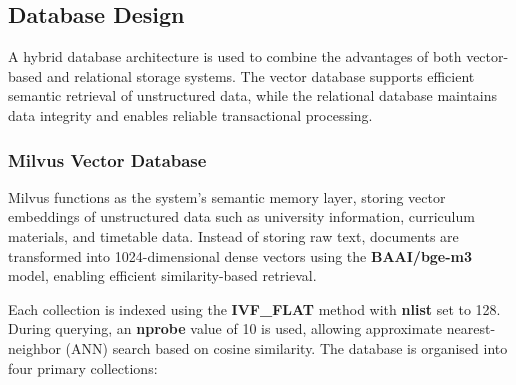 \subsection{Database Design}

A hybrid database architecture is used to combine the advantages of both vector-based and relational storage systems. The vector database supports efficient semantic retrieval of unstructured data, while the relational database maintains data integrity and enables reliable transactional processing.
\subsubsection{Milvus Vector Database}

Milvus functions as the system’s semantic memory layer, storing vector embeddings of unstructured data such as university information, curriculum materials, and timetable data. Instead of storing raw text, documents are transformed into 1024-dimensional dense vectors using the \textbf{BAAI/bge-m3} model, enabling efficient similarity-based retrieval.

Each collection is indexed using the \textbf{IVF\_FLAT} method with \textbf{nlist} set to 128. During querying, an \textbf{nprobe} value of 10 is used, allowing approximate nearest-neighbor (ANN) search based on cosine similarity.
The database is organised into four primary collections:

